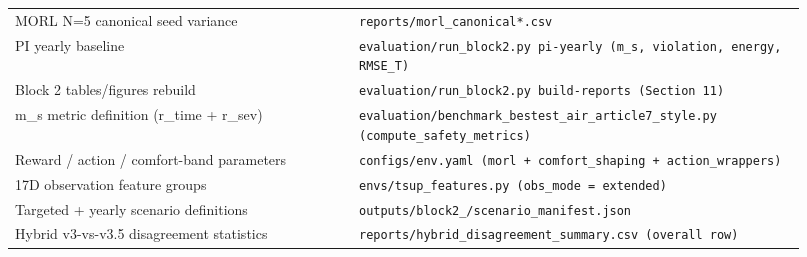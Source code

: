 \documentclass[11pt,a4paper]{article}
\begin{document}
\begin{longtable}{@{}p{0.40\linewidth} p{0.52\linewidth}@{}}
MORL N=5 canonical seed variance & \texttt{reports/\allowbreak morl\_\allowbreak *canonical*.csv} \\
PI yearly baseline & \texttt{evaluation/\allowbreak run\_\allowbreak block2.py pi-yearly  (m\_\allowbreak s, violation, energy, RMSE\_\allowbreak T)} \\
Block 2 tables/figures rebuild & \texttt{evaluation/\allowbreak run\_\allowbreak block2.py build-reports  (Section 11)} \\
m\_s metric definition (r\_time + r\_sev) & \texttt{evaluation/\allowbreak benchmark\_\allowbreak bestest\_\allowbreak air\_\allowbreak article7\_\allowbreak style.py (compute\_\allowbreak safety\_\allowbreak metrics)} \\
Reward / action / comfort-band parameters & \texttt{configs/\allowbreak env.yaml  (morl + comfort\_\allowbreak shaping + action\_\allowbreak wrappers)} \\
17D observation feature groups & \texttt{envs/\allowbreak tsup\_\allowbreak features.py  (obs\_\allowbreak mode = extended)} \\
Targeted + yearly scenario definitions & \texttt{outputs/\allowbreak block2\_\allowbreak */\allowbreak scenario\_\allowbreak manifest.json} \\
Hybrid v3-vs-v3.5 disagreement statistics & \texttt{reports/\allowbreak hybrid\_\allowbreak disagreement\_\allowbreak summary.csv  (overall row)} \\
\bottomrule
\end{longtable}
\normalsize
\end{document}
